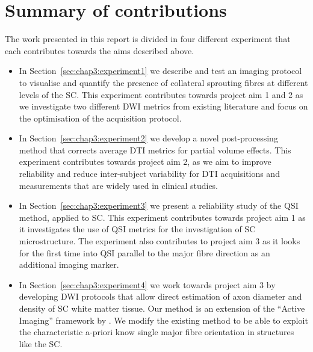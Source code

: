 \section{Summary of contributions}
The work presented in this report is divided in four different experiment that each contributes towards the aims described above.
\begin{itemize}
  \item In Section~\ref{sec:chap3:experiment1} we describe and test an imaging protocol to visualise and quantify the presence of collateral sprouting fibres at different levels of the \gls{SC}. This experiment contributes towards project aim 1 and 2 as we investigate two different \gls{DWI} metrics from existing literature and focus on the optimisation of the acquisition protocol.
  \item In Section~\ref{sec:chap3:experiment2} we develop a novel post-processing method that corrects average \gls{DTI} metrics for partial volume effects. This experiment contributes towards project aim 2, as we aim to improve reliability and reduce inter-subject variability for \gls{DTI} acquisitions and measurements that are widely used in clinical studies.
  \item In Section~\ref{sec:chap3:experiment3} we present a reliability study of the \gls{QSI} method, applied to \gls{SC}. This experiment contributes towards project aim 1  as it investigates the use of \gls{QSI} metrics for the investigation of \gls{SC} microstructure. The experiment also contributes to project aim 3 as it looks for the first time into \gls{QSI} parallel to the major fibre direction as an additional imaging marker.
  \item In Section~\ref{sec:chap3:experiment4} we work towards project aim 3 by developing \gls{DWI} protocols that allow direct estimation of axon diameter and density of SC white matter tissue. Our method is an extension of the ``Active Imaging'' framework by \citet{Alexander:2010}. We modify the existing method to be able to exploit the characteristic a-priori know single major fibre orientation in structures like the \gls{SC}. 
\end{itemize}
